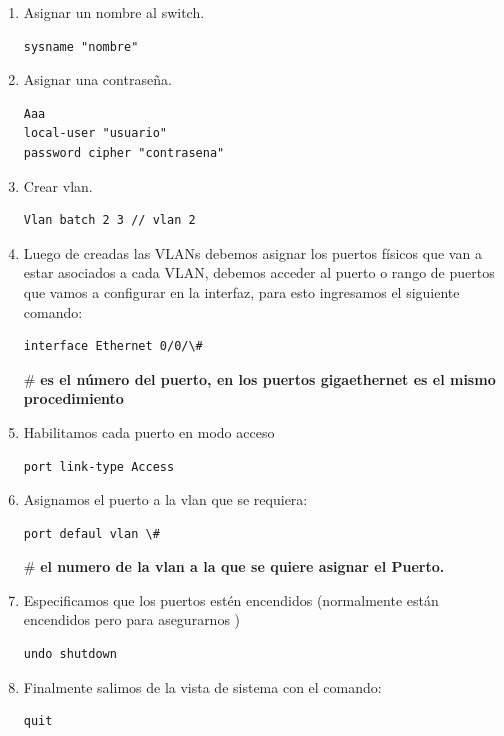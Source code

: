 \documentclass[journal]{IEEEtran}
\begin{document}
\begin{enumerate}
	\item Asignar un nombre al switch.
	\begin{lstlisting}[frame=single]
sysname "nombre"
	\end{lstlisting}
	
	\item Asignar una contraseña. 
	\begin{lstlisting}[frame=single]
Aaa
local-user "usuario" 
password cipher "contrasena"
	\end{lstlisting}
	
	\item Crear vlan.
	\begin{lstlisting}[frame=single]
Vlan batch 2 3 // vlan 2 
	\end{lstlisting}
	
	\item Luego de creadas las VLANs debemos asignar los puertos físicos que van a estar asociados a cada VLAN, debemos acceder al puerto o rango de puertos que vamos a configurar en la interfaz, para esto ingresamos el siguiente comando:
	\begin{lstlisting}[frame=single]
interface Ethernet 0/0/\# 
	\end{lstlisting}
	
	\#  \textbf{es el número del puerto, en los puertos gigaethernet es el mismo procedimiento}
	\item Habilitamos cada puerto en modo acceso
	\begin{lstlisting}[frame=single]
port link-type Access
	\end{lstlisting}
	
	\item Asignamos el puerto a la vlan que se requiera:
	\begin{lstlisting}[frame=single]
port defaul vlan \#
	\end{lstlisting}
	
	\# \textbf{el numero de la vlan a la que se quiere asignar el Puerto.}
	
	\item Especificamos que los puertos estén encendidos (normalmente están encendidos pero para asegurarnos )
	\begin{lstlisting}[frame=single]
undo shutdown
	\end{lstlisting}
	
	\item Finalmente salimos de la vista de sistema con el comando:
	\begin{lstlisting}[frame=single]
quit
	\end{lstlisting}
	

\end{enumerate}
\end{document}
